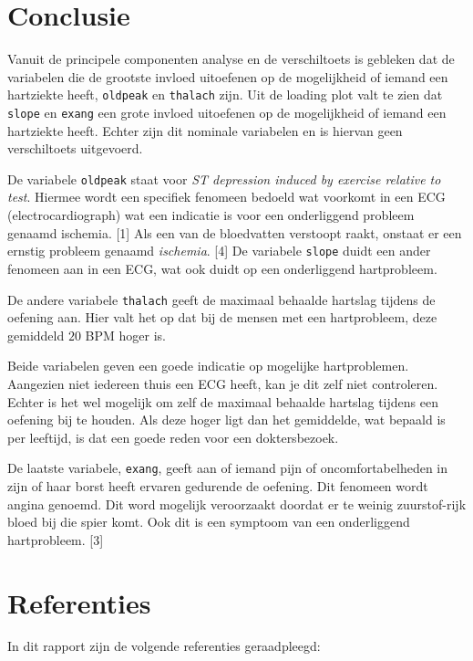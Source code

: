 \documentclass[11pt]{article}
\begin{document}
    \hypertarget{conclusie}{%
\section{Conclusie}\label{conclusie}}

    Vanuit de principele componenten analyse en de verschiltoets is gebleken
dat de variabelen die de grootste invloed uitoefenen op de mogelijkheid
of iemand een hartziekte heeft, \texttt{oldpeak} en \texttt{thalach}
zijn. Uit de loading plot valt te zien dat \texttt{slope} en
\texttt{exang} een grote invloed uitoefenen op de mogelijkheid of iemand
een hartziekte heeft. Echter zijn dit nominale variabelen en is hiervan
geen verschiltoets uitgevoerd.

De variabele \texttt{oldpeak} staat voor \emph{ST depression induced by
exercise relative to test}. Hiermee wordt een specifiek fenomeen bedoeld
wat voorkomt in een ECG (electrocardiograph) wat een indicatie is voor
een onderliggend probleem genaamd ischemia. {[}1{]} Als een van de
bloedvatten verstoopt raakt, onstaat er een ernstig probleem genaamd
\emph{ischemia}. {[}4{]} De variabele \texttt{slope} duidt een ander
fenomeen aan in een ECG, wat ook duidt op een onderliggend hartprobleem.

De andere variabele \texttt{thalach} geeft de maximaal behaalde hartslag
tijdens de oefening aan. Hier valt het op dat bij de mensen met een
hartprobleem, deze gemiddeld \(20\) BPM hoger is.

Beide variabelen geven een goede indicatie op mogelijke hartproblemen.
Aangezien niet iedereen thuis een ECG heeft, kan je dit zelf niet
controleren. Echter is het wel mogelijk om zelf de maximaal behaalde
hartslag tijdens een oefening bij te houden. Als deze hoger ligt dan het
gemiddelde, wat bepaald is per leeftijd, is dat een goede reden voor een
doktersbezoek.

De laatste variabele, \texttt{exang}, geeft aan of iemand pijn of
oncomfortabelheden in zijn of haar borst heeft ervaren gedurende de
oefening. Dit fenomeen wordt angina genoemd. Dit word mogelijk
veroorzaakt doordat er te weinig zuurstof-rijk bloed bij die spier komt.
Ook dit is een symptoom van een onderliggend hartprobleem. {[}3{]}

    \hypertarget{referenties}{%
\section{Referenties}\label{referenties}}

    In dit rapport zijn de volgende referenties geraadpleegd:
\end{document}
